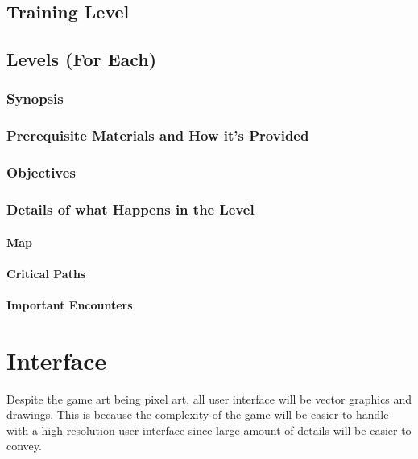 \documentclass[12pt]{article}
\begin{document}
\subsection{Training Level}

\subsection{Levels (For Each)}

\subsubsection{Synopsis}

\subsubsection{Prerequisite Materials and How it's Provided}

\subsubsection{Objectives}

\subsubsection{Details of what Happens in the Level}

\paragraph{Map}

\paragraph{Critical Paths}

\paragraph{Important Encounters}

\section{Interface}

Despite the game art being pixel art, all user interface will be vector graphics and drawings. This is because the complexity of the game will be easier to handle with a high-resolution user interface since large amount of details will be easier to convey. 
\end{document}

